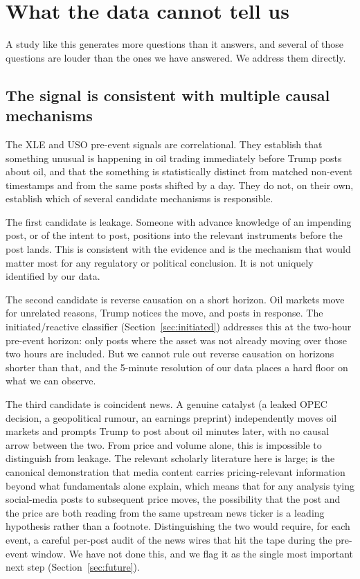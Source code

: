 \documentclass[11pt,a4paper]{article}
\begin{document}
\section{What the data cannot tell us}\label{sec:cannot}

A study like this generates more questions than it answers, and several of those questions are louder than the ones we have answered. We address them directly.

\subsection{The signal is consistent with multiple causal mechanisms}

The XLE and USO pre-event signals are correlational. They establish that something unusual is happening in oil trading immediately before Trump posts about oil, and that the something is statistically distinct from matched non-event timestamps and from the same posts shifted by a day. They do not, on their own, establish which of several candidate mechanisms is responsible.

The first candidate is leakage. Someone with advance knowledge of an impending post, or of the intent to post, positions into the relevant instruments before the post lands. This is consistent with the evidence and is the mechanism that would matter most for any regulatory or political conclusion. It is not uniquely identified by our data.

The second candidate is reverse causation on a short horizon. Oil markets move for unrelated reasons, Trump notices the move, and posts in response. The initiated/reactive classifier (Section~\ref{sec:initiated}) addresses this at the two-hour pre-event horizon: only posts where the asset was not already moving over those two hours are included. But we cannot rule out reverse causation on horizons shorter than that, and the 5-minute resolution of our data places a hard floor on what we can observe.

The third candidate is coincident news. A genuine catalyst (a leaked OPEC decision, a geopolitical rumour, an earnings preprint) independently moves oil markets and prompts Trump to post about oil minutes later, with no causal arrow between the two. From price and volume alone, this is impossible to distinguish from leakage. The relevant scholarly literature here is large; \citet{tetlock2007} is the canonical demonstration that media content carries pricing-relevant information beyond what fundamentals alone explain, which means that for any analysis tying social-media posts to subsequent price moves, the possibility that the post and the price are both reading from the same upstream news ticker is a leading hypothesis rather than a footnote. Distinguishing the two would require, for each event, a careful per-post audit of the news wires that hit the tape during the pre-event window. We have not done this, and we flag it as the single most important next step (Section~\ref{sec:future}).
\end{document}
